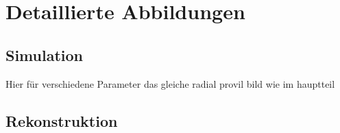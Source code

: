 \chapter{Detaillierte Abbildungen}
\section{Simulation}
Hier für verschiedene Parameter das gleiche radial provil bild wie im hauptteil

\section{Rekonstruktion}